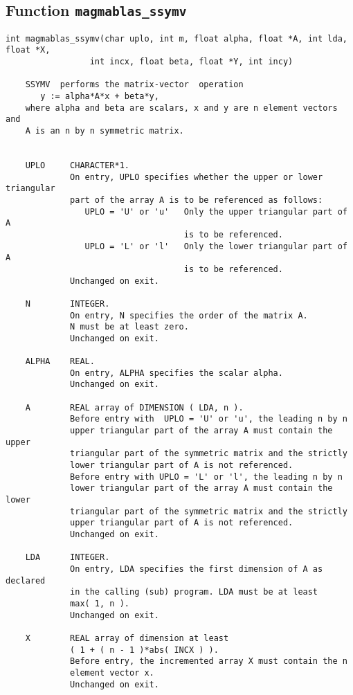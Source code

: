 \documentclass[10pt]{book}
\begin{document}
\subsection{Function {\tt {\bf magmablas\_ssymv}}}
\begin{verbatim}
int magmablas_ssymv(char uplo, int m, float alpha, float *A, int lda, float *X, 
                 int incx, float beta, float *Y, int incy)

    SSYMV  performs the matrix-vector  operation
       y := alpha*A*x + beta*y,
    where alpha and beta are scalars, x and y are n element vectors and
    A is an n by n symmetric matrix.

 
    UPLO     CHARACTER*1.
             On entry, UPLO specifies whether the upper or lower triangular 
             part of the array A is to be referenced as follows:
                UPLO = 'U' or 'u'   Only the upper triangular part of A
                                    is to be referenced.
                UPLO = 'L' or 'l'   Only the lower triangular part of A
                                    is to be referenced.
             Unchanged on exit.

    N        INTEGER.
             On entry, N specifies the order of the matrix A.
             N must be at least zero.
             Unchanged on exit.

    ALPHA    REAL.
             On entry, ALPHA specifies the scalar alpha.
             Unchanged on exit.

    A        REAL array of DIMENSION ( LDA, n ).
             Before entry with  UPLO = 'U' or 'u', the leading n by n
             upper triangular part of the array A must contain the upper
             triangular part of the symmetric matrix and the strictly
             lower triangular part of A is not referenced.
             Before entry with UPLO = 'L' or 'l', the leading n by n
             lower triangular part of the array A must contain the lower
             triangular part of the symmetric matrix and the strictly
             upper triangular part of A is not referenced.
             Unchanged on exit.

    LDA      INTEGER.
             On entry, LDA specifies the first dimension of A as declared
             in the calling (sub) program. LDA must be at least
             max( 1, n ).
             Unchanged on exit.

    X        REAL array of dimension at least
             ( 1 + ( n - 1 )*abs( INCX ) ).
             Before entry, the incremented array X must contain the n
             element vector x.
             Unchanged on exit.


\end{verbatim}
\end{document}
